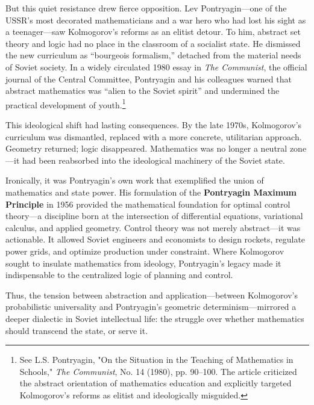 But this quiet resistance drew fierce opposition. Lev Pontryagin—one of the USSR’s most decorated mathematicians and a war hero who had lost his sight as a teenager—saw Kolmogorov’s reforms as an elitist detour. To him, abstract set theory and logic had no place in the classroom of a socialist state. He dismissed the new curriculum as “bourgeois formalism,” detached from the material needs of Soviet society. In a widely circulated 1980 essay in \textit{The Communist}, the official journal of the Central Committee, Pontryagin and his colleagues warned that abstract mathematics was “alien to the Soviet spirit” and undermined the practical development of youth.\footnote{See L.S. Pontryagin, "On the Situation in the Teaching of Mathematics in Schools," \textit{The Communist}, No. 14 (1980), pp. 90–100. The article criticized the abstract orientation of mathematics education and explicitly targeted Kolmogorov’s reforms as elitist and ideologically misguided.}

This ideological shift had lasting consequences. By the late 1970s, Kolmogorov’s curriculum was dismantled, replaced with a more concrete, utilitarian approach. Geometry returned; logic disappeared. Mathematics was no longer a neutral zone—it had been reabsorbed into the ideological machinery of the Soviet state.

Ironically, it was Pontryagin’s own work that exemplified the union of mathematics and state power. His formulation of the \textbf{Pontryagin Maximum Principle} in 1956 provided the mathematical foundation for optimal control theory—a discipline born at the intersection of differential equations, variational calculus, and applied geometry. Control theory was not merely abstract—it was actionable. It allowed Soviet engineers and economists to design rockets, regulate power grids, and optimize production under constraint. Where Kolmogorov sought to insulate mathematics from ideology, Pontryagin’s legacy made it indispensable to the centralized logic of planning and control.

Thus, the tension between abstraction and application—between Kolmogorov’s probabilistic universality and Pontryagin’s geometric determinism—mirrored a deeper dialectic in Soviet intellectual life: the struggle over whether mathematics should transcend the state, or serve it.

